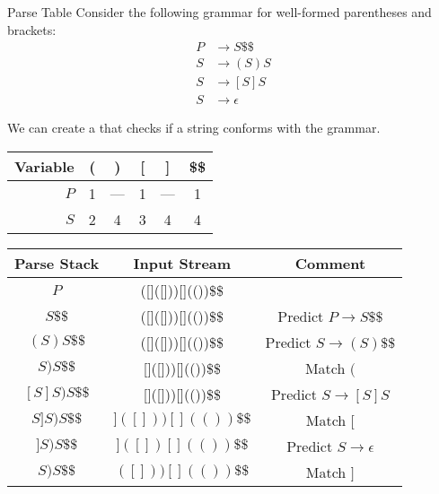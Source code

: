 \begin{exbox}{Parse Table}{}
    Consider the following grammar for well-formed parentheses and brackets:
    \begin{align}
        P &\to S\$\$ \\
        S &\to (S)S \\
        S &\to [S]S \\
        S &\to \epsilon
    \end{align}

    We can create a  that checks if a string conforms with the grammar.

    \begin{center}\begin{tabular}{r | c c c c c}
        Variable & ( & ) & [ & ] & \$\$ \\ \hline
        $P$ & 1 & --- & 1 & --- & 1 \\
        $S$ & 2 & 4 & 3 & 4 & 4
    \end{tabular}\end{center}

    \begin{center}\begin{tabular}{c | c | c}
        Parse Stack & Input Stream & Comment \\ \hline
        $P$ & ([]([]))[](())\$\$ & \\
        $S\$\$$ & ([]([]))[](())\$\$ & Predict $P \to S\$\$$ \\
        $(S)S\$\$$ & ([]([]))[](())\$\$ & Predict $S \to (S)\$\$$ \\
        $S)S\$\$$ & []([]))[](())\$\$ & Match $($ \\
        $[S]S)S\$\$$ & []([]))[](())\$\$ & Predict $S \to [S]S$ \\
        $S]S)S\$\$$ & $]([]))[](())\$\$$ & Match $[$ \\
        $]S)S\$\$$ & $]([])[](())\$\$$ & Predict $S \to \epsilon$ \\
        $S)S\$\$$ & $([]))[](())\$\$$ & Match $]$
    \end{tabular}\end{center}
\end{exbox}

